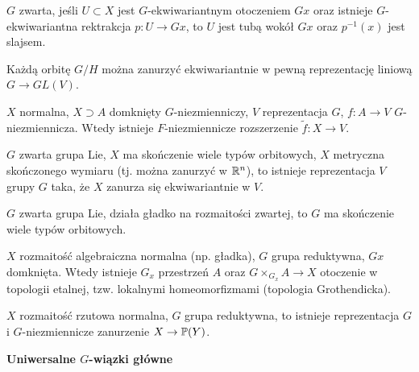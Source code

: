 

 

 \begin{twierdzenie}
  $G$ zwarta, jeśli $U \subset X$ jest $G$-ekwiwariantnym otoczeniem $Gx$ oraz istnieje $G$-ekwiwariantna rektrakcja $p: U \to Gx$, to $U$ jest tubą wokół $Gx$ oraz $p^{-1}(x)$ jest slajsem.
 \end{twierdzenie}
 
 \begin{twierdzeniebd}[Chevalley]
  Każdą orbitę $G/H$ można zanurzyć ekwiwariantnie w pewną reprezentację liniową $G \to GL(V)$.
 \end{twierdzeniebd}
 
 \begin{twierdzeniebd}
  $X$ normalna, $X \supset A$ domknięty $G$-niezmienniczy, $V$ reprezentacja $G$, $f:A \to V$ $G$-niezmiennicza. Wtedy istnieje $F$-niezmiennicze rozszerzenie $\tilde{f}:X \to V$.
 \end{twierdzeniebd}
 
 \begin{twierdzeniebd}[Mostow]
  $G$ zwarta grupa Lie, $X$ ma skończenie wiele typów orbitowych, $X$ metryczna skończonego wymiaru (tj. można zanurzyć w ${\mathbb{R}}^n$), to istnieje reprezentacja $V$ grupy $G$ taka, że $X$ zanurza się ekwiwariantnie w $V$.
 \end{twierdzeniebd}
 
 \begin{twierdzenie}
  $G$ zwarta grupa Lie, działa gładko na rozmaitości zwartej, to $G$ ma skończenie wiele typów orbitowych.
 \end{twierdzenie}
 
 \begin{twierdzeniebd}
  $X$ rozmaitość algebraiczna normalna (np. gładka), $G$ grupa reduktywna, $Gx$ domknięta. Wtedy istnieje $G_x$ przestrzeń $A$ oraz $G \times_{G_x} A \to X$ otoczenie w topologii etalnej, tzw. lokalnymi homeomorfizmami (topologia Grothendicka).
 \end{twierdzeniebd}
 
 \begin{twierdzeniebd}
  $X$ rozmaitość rzutowa normalna, $G$ grupa reduktywna, to istnieje reprezentacja $G$ i $G$-niezmiennicze zanurzenie $X \to {\mathbb{P}}(Y)$.
 \end{twierdzeniebd}
 
 {\bf Uniwersalne $G$-wiązki główne}
 
